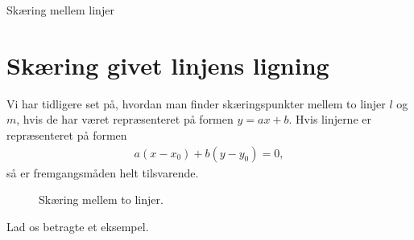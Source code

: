 \begin{center}
\Huge
Skæring mellem linjer
\end{center}

\section*{Skæring givet linjens ligning}

Vi har tidligere set på, hvordan man finder skæringspunkter mellem to linjer $l$ og $m$, hvis de har været repræsenteret på formen $y = ax+b$. Hvis linjerne er repræsenteret på formen 
\begin{align*}
	a(x-x_0) + b(y-y_0) = 0, 
\end{align*}
så er fremgangsmåden helt tilsvarende. 
\begin{figure}[H]
	\centering
	\caption{Skæring mellem to linjer.}
	\label{fig:linjeligning}
\end{figure}
Lad os betragte et eksempel.
